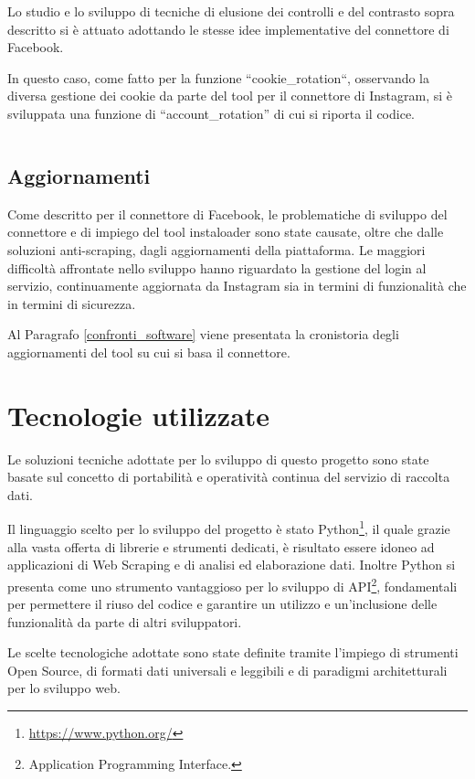 \newpage

Lo studio e lo sviluppo di tecniche di elusione dei controlli e del contrasto sopra descritto si \`e attuato adottando le stesse idee implementative del connettore di Facebook.

In questo caso, come fatto per la funzione ``cookie\_rotation``, osservando la diversa gestione dei cookie da parte del tool per il connettore di Instagram, si \`e sviluppata una funzione di ``account\_rotation'' di cui si riporta il codice.

\inputminted[bgcolor=bg]{python}{codice/account_rotation_insta.txt}

\subsection{Aggiornamenti}
Come descritto per il connettore di Facebook, le problematiche di sviluppo del connettore e di impiego del tool instaloader sono state causate, oltre che dalle soluzioni anti-scraping, dagli aggiornamenti della piattaforma.
Le maggiori difficolt\`a affrontate nello sviluppo hanno riguardato la gestione del login al servizio, continuamente aggiornata da Instagram sia in termini di funzionalit\`a che in termini di sicurezza.

Al Paragrafo \ref{confronti_software} viene presentata la cronistoria degli aggiornamenti del tool su cui si basa il connettore.
\section{Tecnologie utilizzate} \label{tecnologie_utilizzate}
Le soluzioni tecniche adottate per lo sviluppo di questo progetto sono state basate sul concetto di portabilit\`a e operativit\`a continua del servizio di raccolta dati. 

Il linguaggio scelto per lo sviluppo del progetto \`e stato Python\footnote{\url{https://www.python.org/}}, il quale grazie alla vasta offerta di librerie e strumenti dedicati, \`e risultato essere idoneo ad applicazioni di Web Scraping e di analisi ed elaborazione dati.
Inoltre Python si presenta come uno strumento vantaggioso per lo sviluppo di API\footnote{Application Programming Interface.}, fondamentali per permettere il riuso del codice e garantire un utilizzo e un'inclusione delle funzionalit\`a da parte di altri sviluppatori. 

Le scelte tecnologiche adottate sono state definite tramite l'impiego di strumenti Open Source, di formati dati universali e leggibili e di paradigmi architetturali per lo sviluppo web.

